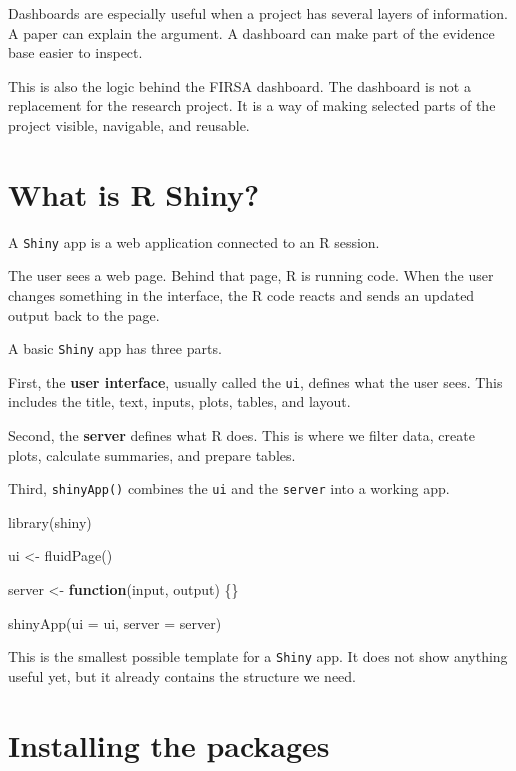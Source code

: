 \documentclass[
  letterpaper,
  DIV=11,
  numbers=noendperiod]{scrreprt}
\newenvironment{Shaded}{\begin{snugshade}}{\end{snugshade}}
\newcommand{\AttributeTok}[1]{\textcolor[rgb]{0.40,0.45,0.13}{#1}}
\newcommand{\ControlFlowTok}[1]{\textcolor[rgb]{0.00,0.23,0.31}{\textbf{#1}}}
\newcommand{\FunctionTok}[1]{\textcolor[rgb]{0.28,0.35,0.67}{#1}}
\newcommand{\NormalTok}[1]{\textcolor[rgb]{0.00,0.23,0.31}{#1}}
\newcommand{\OtherTok}[1]{\textcolor[rgb]{0.00,0.23,0.31}{#1}}
\begin{document}
Dashboards are especially useful when a project has several layers of
information. A paper can explain the argument. A dashboard can make part
of the evidence base easier to inspect.

This is also the logic behind the FIRSA dashboard. The dashboard is not
a replacement for the research project. It is a way of making selected
parts of the project visible, navigable, and reusable.

\section{What is R Shiny?}\label{what-is-r-shiny}

A \texttt{Shiny} app is a web application connected to an R session.

The user sees a web page. Behind that page, R is running code. When the
user changes something in the interface, the R code reacts and sends an
updated output back to the page.

A basic \texttt{Shiny} app has three parts.

First, the \textbf{user interface}, usually called the \texttt{ui},
defines what the user sees. This includes the title, text, inputs,
plots, tables, and layout.

Second, the \textbf{server} defines what R does. This is where we filter
data, create plots, calculate summaries, and prepare tables.

Third, \texttt{shinyApp()} combines the \texttt{ui} and the
\texttt{server} into a working app.

\begin{Shaded}
\begin{Highlighting}[]
\FunctionTok{library}\NormalTok{(shiny)}

\NormalTok{ui }\OtherTok{\textless{}{-}} \FunctionTok{fluidPage}\NormalTok{()}

\NormalTok{server }\OtherTok{\textless{}{-}} \ControlFlowTok{function}\NormalTok{(input, output) \{\}}

\FunctionTok{shinyApp}\NormalTok{(}\AttributeTok{ui =}\NormalTok{ ui, }\AttributeTok{server =}\NormalTok{ server)}
\end{Highlighting}
\end{Shaded}

This is the smallest possible template for a \texttt{Shiny} app. It does
not show anything useful yet, but it already contains the structure we
need.

\section{Installing the packages}\label{installing-the-packages}
\end{document}
